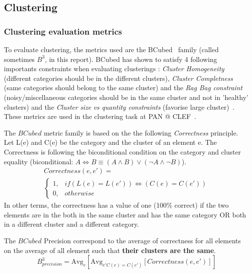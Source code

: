 \subsection{Clustering}

\subsubsection{Clustering evaluation metrics}

To evaluate clustering, the metrics used are the BCubed~\cite{bcubed} family (called sometimes $B^3$, in this report).
BCubed has shown to satisfy 4 following importants constraints when evaluating clusterings : \textit{Cluster Homogeneity} (different categories should be in the different clusters), \textit{Cluster Completness} (same categories should belong to the same cluster) and the \textit{Rag Bag constraint} (noisy/miscellaneous categories should be in the same cluster and not in 'healthy' clusters) and the \textit{Cluster size vs quantity constraints} (favorise large cluster)~\cite{bcubed}.
These metrics are used in the clustering task at PAN @ CLEF~\cite{pan16}.

\begin{definition}
  The $BCubed$ metric family is based on the the following \textit{Correctness} principle.
  Let L(e) and C(e) be the category and the cluster of an element e.
  The Correctness is following the biconditional condition on the category and cluster equality (biconditional: $A \Longleftrightarrow B \equiv (A \land B) \lor (\neg A \land \neg B)$).
  \begin{gather*}
    Correctness(e, e') = \\
    \begin{cases}
      1, & if (L(e) = L(e')) \Longleftrightarrow (C(e) = C(e'))\\
      0, & otherwise
    \end{cases}
  \end{gather*}
  In other terms, the correctness has a value of one (100\% correct) if the two elements are in the both in the same cluster and has the same category OR both in a different cluster and a different category.
\end{definition}

\begin{definition}
  The $BCubed$ Precision correspond to the average of correctness for all elements on the average of all element such that \textbf{their clusters are the same}.
  \begin{equation}
    B^3_{precision} = \text{Avg}_{e}[\text{Avg}_{e' C(e)=C(e')}[Correctness(e, e')]]
  \end{equation}
\end{definition}


